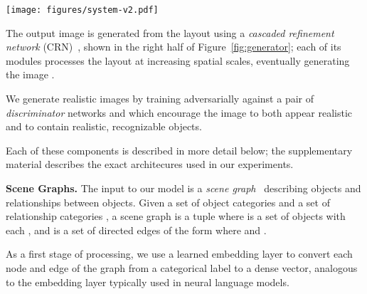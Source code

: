 \documentclass[10pt,twocolumn,letterpaper]{article}
\begin{document}
\begin{figure*}
  \centering
  \texttt{[image: figures/system-v2.pdf]}
  \vspace{-4mm}
  \caption{
    Overview of our image generation network  for generating images from
    scene graphs.
    The input to the model is a \emph{scene graph} specifying objects and relationships;
    it is processed with a \emph{graph convolution network} (Figure~\ref{fig:gconv}) which passes information along
    edges to compute embedding vectors for all objects. These vectors are used to predict
    bounding boxes and segmentation masks for objects, which are combined to form a
    \emph{scene layout} (Figure~\ref{fig:layout}). The layout is converted to an image using a \emph{cascaded refinement network}
    (CRN)~\cite{chen2017photographic}. The model is trained adversarially against a pair of
    \emph{discriminator networks}.
    During training the model observes ground-truth object bounding boxes and (optionally) segmentation masks, but these are predicted by the model at test-time.
  }
  \vspace{-2mm}
  \label{fig:generator}
\end{figure*}

The output image  is generated from the layout using a
\emph{cascaded refinement network} (CRN)~\cite{chen2017photographic}, shown in the
right half of Figure~\ref{fig:generator}; each of its modules processes the layout
at increasing spatial scales, eventually generating the image .

We generate realistic images by training  adversarially against a
pair of \emph{discriminator} networks  and  which encourage
the image  to both appear realistic and to contain realistic, recognizable
objects.

Each of these components is described in more detail below; the supplementary
material describes the exact architecures used in our experiments.

\textbf{Scene Graphs.}
The input to our model is a \emph{scene graph}~\cite{johnson2015image}
describing objects and relationships between objects.
Given a set of object categories  and a set of relationship
categories , a scene graph is a tuple  where
 is a set of objects with each ,
and  is a set of directed edges of
the form  where  and .

As a first stage of processing, we use a learned embedding layer to convert
each node and edge of the graph from a categorical label to a dense vector,
analogous to the embedding layer typically used in neural language models.
\end{document}
